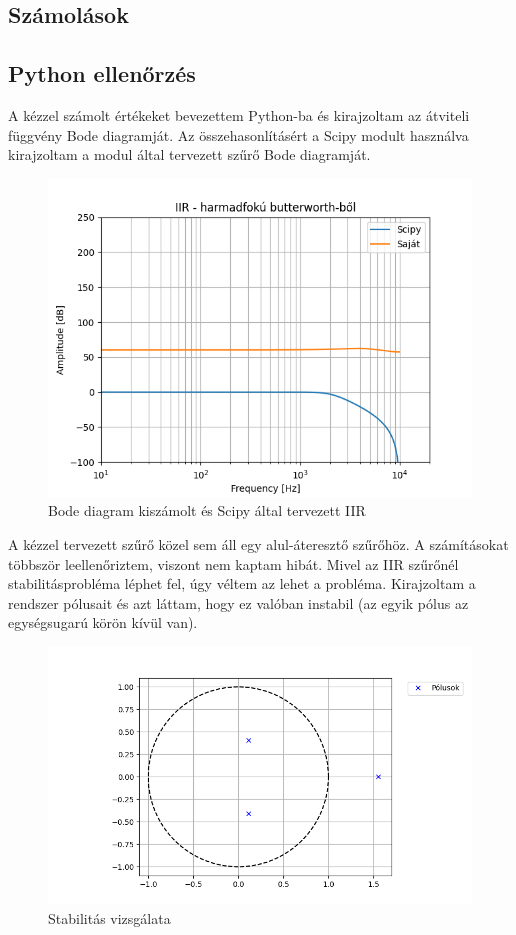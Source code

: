 \subsection{Számolások}


\subsection{Python ellenőrzés}

A kézzel számolt értékeket bevezettem Python-ba és kirajzoltam az átviteli függvény Bode diagramját. Az összehasonlításért a Scipy modult használva kirajzoltam a modul által tervezett szűrő Bode diagramját.

\begin{figure}[H]
    \centering
    \includegraphics[scale=0.5]{figures/bode.png}
    \caption{Bode diagram kiszámolt és Scipy által tervezett IIR}
\end{figure}


A kézzel tervezett szűrő közel sem áll egy alul-áteresztő szűrőhöz. A számításokat többször leellenőriztem, viszont nem kaptam hibát. Mivel az IIR szűrőnél stabilitásprobléma léphet fel, úgy véltem az lehet a probléma. Kirajzoltam a rendszer pólusait és azt láttam, hogy ez valóban instabil (az egyik pólus az egységsugarú körön kívül van).

\begin{figure}[H]
    \centering
    \includegraphics[scale=0.5]{figures/poles.png}
    \caption{Stabilitás vizsgálata}
\end{figure}

